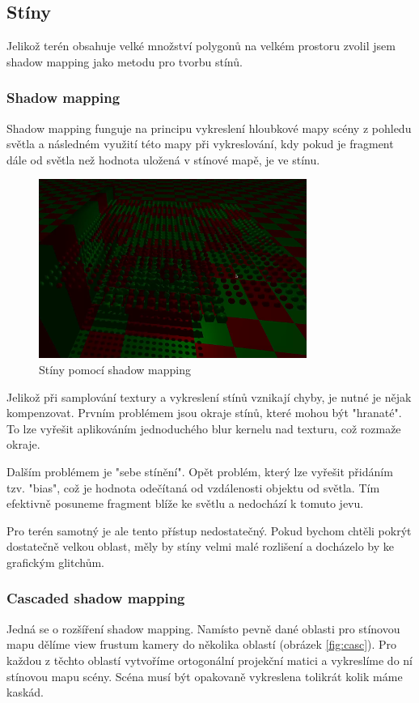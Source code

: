 \documentclass[12pt,a4paper,titlepage,final]{report}
\begin{document}
\subsection{Stíny}
Jelikož terén obsahuje velké množství polygonů na velkém prostoru zvolil jsem shadow mapping jako metodu pro tvorbu stínů.

\subsubsection{Shadow mapping}
Shadow mapping funguje na principu vykreslení hloubkové mapy scény z pohledu světla a následném využití této mapy při vykreslování, kdy pokud je fragment dále od světla než hodnota uložená v stínové mapě, je ve stínu. 

\begin{figure}[H]
    \centering
    \includegraphics[scale=1]{images/shadow_map.png}
    \caption{Stíny pomocí shadow mapping}
    \label{fig:sm}
\end{figure}

Jelikož při samplování textury a vykreslení stínů vznikají chyby, je nutné je nějak kompenzovat. Prvním problémem jsou okraje stínů, které mohou být "hranaté". To lze vyřešit aplikováním jednoduchého blur kernelu nad texturu, což rozmaže okraje. 

Dalším problémem je "sebe stínění". Opět problém, který lze vyřešit přidáním tzv. "bias", což je hodnota odečítaná od vzdálenosti objektu od světla. Tím efektivně posuneme fragment blíže ke světlu a nedochází k tomuto jevu.

Pro terén samotný je ale tento přístup nedostatečný. Pokud bychom chtěli pokrýt dostatečně velkou oblast, měly by stíny velmi malé rozlišení a docházelo by ke grafickým glitchům.

\subsubsection{Cascaded shadow mapping}
Jedná se o rozšíření shadow mapping. Namísto pevně dané oblasti pro stínovou mapu dělíme view frustum kamery do několika oblastí (obrázek \ref{fig:casc}). Pro každou z těchto oblastí vytvoříme ortogonální projekční matici a vykreslíme do ní stínovou mapu scény. Scéna musí být opakovaně vykreslena tolikrát kolik máme kaskád.
\end{document}

